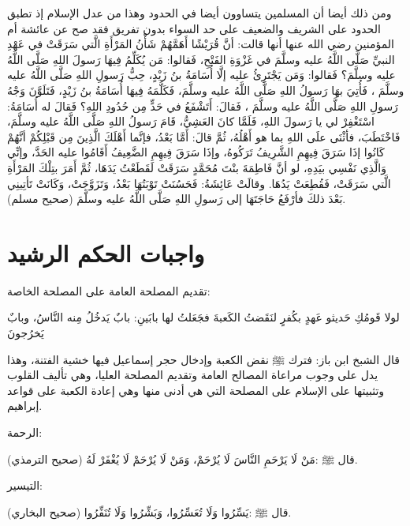 ومن ذلك أيضا أن المسلمين يتساوون أيضا في الحدود وهذا من عدل الإسلام إذ تطبق الحدود على الشريف والضعيف على حد السواء بدون تفريق فقد صح عن عائشة أم المؤمنين رضي الله عنها أنها قالت: أنَّ قُرَيْشًا أَهَمَّهُمْ شَأْنُ المَرْأَةِ الَّتي سَرَقَتْ في عَهْدِ النبيِّ صَلَّى اللَّهُ عليه وسلَّمَ في غَزْوَةِ الفَتْحِ، فَقالوا: مَن يُكَلِّمُ فِيهَا رَسولَ اللهِ صَلَّى اللَّهُ عليه وسلَّمَ؟ فَقالوا: وَمَن يَجْتَرِئُ عليه إلَّا أُسَامَةُ بنُ زَيْدٍ، حِبُّ رَسولِ اللهِ صَلَّى اللَّهُ عليه وسلَّمَ ، فَأُتِيَ بهَا رَسولُ اللهِ صَلَّى اللَّهُ عليه وسلَّمَ، فَكَلَّمَهُ فِيهَا أُسَامَةُ بنُ زَيْدٍ، فَتَلَوَّنَ وَجْهُ رَسولِ اللهِ صَلَّى اللَّهُ عليه وسلَّمَ ، فَقالَ: أَتَشْفَعُ في حَدٍّ مِن حُدُودِ اللهِ؟ فَقالَ له أُسَامَةُ: اسْتَغْفِرْ لي يا رَسولَ اللهِ، فَلَمَّا كانَ العَشِيُّ، قَامَ رَسولُ اللهِ صَلَّى اللَّهُ عليه وسلَّمَ، فَاخْتَطَبَ، فأثْنَى علَى اللهِ بما هو أَهْلُهُ، ثُمَّ قالَ: أَمَّا بَعْدُ، فإنَّما أَهْلَكَ الَّذِينَ مِن قَبْلِكُمْ أنَّهُمْ كَانُوا إذَا سَرَقَ فِيهِمِ الشَّرِيفُ تَرَكُوهُ، وإذَا سَرَقَ فِيهِمِ الضَّعِيفُ أَقَامُوا عليه الحَدَّ، وإنِّي وَالَّذِي نَفْسِي بيَدِهِ، لو أنَّ فَاطِمَةَ بنْتَ مُحَمَّدٍ سَرَقَتْ لَقَطَعْتُ يَدَهَا، ثُمَّ أَمَرَ بتِلْكَ المَرْأَةِ الَّتي سَرَقَتْ، فَقُطِعَتْ يَدُهَا. وقالَتْ عَائِشَةُ: فَحَسُنَتْ تَوْبَتُهَا بَعْدُ، وَتَزَوَّجَتْ، وَكَانَتْ تَأتِينِي بَعْدَ ذلكَ فأرْفَعُ حَاجَتَهَا إلى رَسولِ اللهِ صَلَّى اللَّهُ عليه وسلَّمَ {\footnotesize (صحيح مسلم)}. 

\section{واجبات الحكم الرشيد}


تقديم المصلحة العامة على المصلحة الخاصة:

لولا قَومُكِ حَديثو عَهدٍ بكُفرٍ لنَقَضتُ الكَعبةَ فجَعَلتُ لها بابَينِ: بابٌ يَدخُلُ مِنه النَّاسُ، وبابٌ يَخرُجونَ

قال الشبخ ابن باز: فترك ﷺ نقض الكعبة وإدخال حجر إسماعيل فيها خشية الفتنة، وهذا يدل على وجوب مراعاة المصالح العامة وتقديم المصلحة العليا، وهي تأليف القلوب وتثبيتها على الإسلام على المصلحة التي هي أدنى منها وهي إعادة الكعبة على قواعد إبراهيم.

الرحمة:

قال ﷺ :مَنْ لَا يَرْحَمِ النَّاسَ لَا يُرْحَمْ، وَمَنْ لَا يُرْحَمْ لَا يُغْفَرْ لَهُ {\footnotesize (صحيح الترمذي)}.


التيسير:

قال ﷺ :يَسِّرُوا وَلَا تُعَسِّرُوا، وَبَشِّرُوا وَلَا تُنَفِّرُوا {\footnotesize (صحيح البخاري)}.

